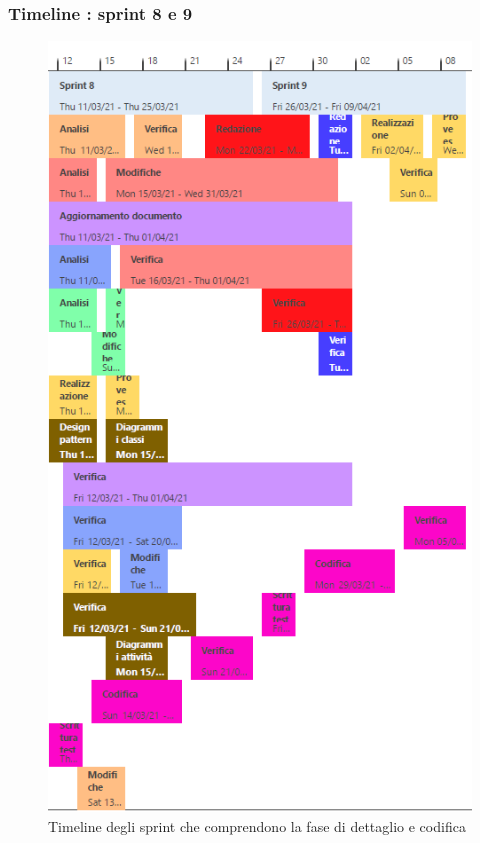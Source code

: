 \subsubsection{Timeline : sprint 8 e 9}
\begin{figure}[H]
    \centering
    \includegraphics[scale = 0.5]{components/img/sprint8-9.png}
    \caption{Timeline degli sprint che comprendono la  fase di dettaglio e codifica}
    \label{fig:Timeline,sprint 8 e 9, fase di dettaglio e codifica}
\end{figure}

